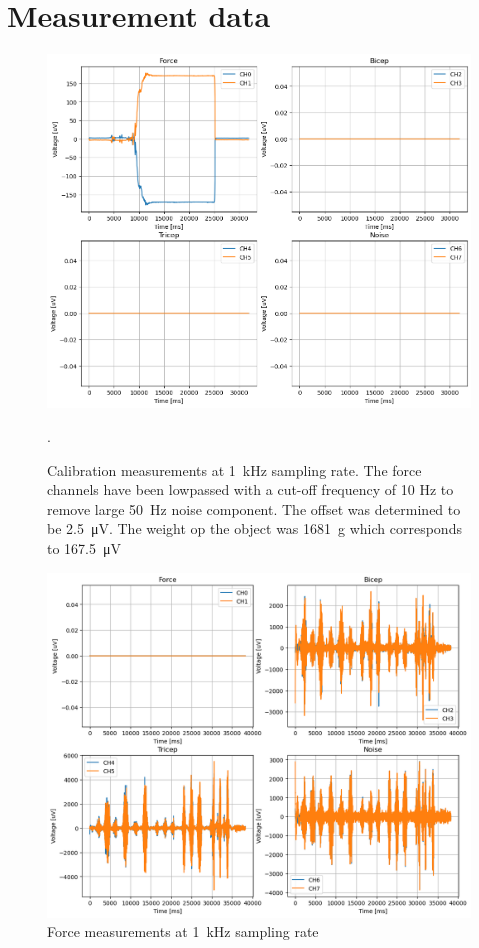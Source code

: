 \section{Measurement data}


\begin{figure}[h!t]
	\begin{center}
		\includegraphics[width=1.0\columnwidth]{images/measurement_calibratie2_1k.png}
	\end{center}
	\caption{Calibration measurements at \SI{1}{\kilo\hertz} sampling rate. The force channels have been lowpassed with a cut-off frequency of 10 Hz to remove large \SI{50}{\hertz} noise component. The offset was determined to be \SI{2.5}{\micro\volt}. The weight op the object was \SI{1681}{\gram} which corresponds to \SI{167.5}{\micro\volt}}.
	\label{fig:calibration_1k}
\end{figure}

\begin{figure}[h!t]
	\begin{center}
		\includegraphics[width=0.8\columnwidth]{images/measurement_meting2_1k.png}
	\end{center}
	\caption{Force measurements at \SI{1}{\kilo\hertz} sampling rate}
	\label{fig:measurement_1k}
\end{figure}

